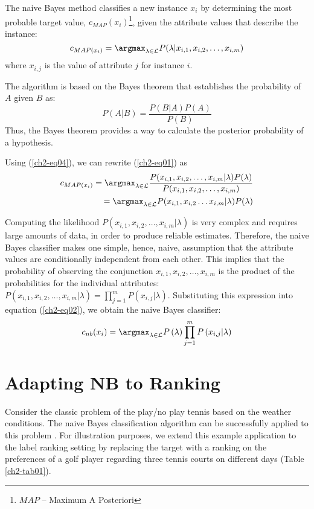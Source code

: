 The naive Bayes method classifies a new instance $x_i$ by determining the most probable target value, $c_{MAP}(x_i)$\footnote[4]{$MAP$ -- Maximum A Posteriori}, given the attribute values that describe the instance:
\begin{equation}
\label{ch2-eq01}
c_{MAP(x_i)}= \argmax_{\lambda \in \mathcal{L}} P(\lambda|x_{i,1}, x_{i,2}, \ldots, x_{i,m})
\end{equation}
where $x_{i,j}$ is the value of attribute $j$ for instance $i$.

The algorithm is based on the  Bayes theorem that establishes the probability of $A$ given $B$ as:
\begin{equation}
\label{ch2-eq04}
 P(A|B)=\frac{P(B|A)P(A)}{P(B)}
\end{equation}
Thus, the Bayes theorem provides a way to calculate the posterior probability of a hypothesis.

Using (\ref{ch2-eq04}), we can rewrite (\ref{ch2-eq01}) as
\begin{align}
\label{ch2-eq02}
 c_{MAP(x_i)}= \argmax_{\lambda\in \mathcal{L}} \frac{P(x_{i,1},x_{i,2}, \ldots, x_{i,m}|\lambda)P(\lambda)}{P(x_{i,1},x_{i,2}, \ldots, x_{i,m})} \notag \\
=\argmax_{\lambda\in \mathcal{L}} P(x_{i,1},x_{i,2} \ldots x_{i,m}|\lambda)P(\lambda)
\end{align}



Computing the likelihood $P(x_{i,1}, x_{i,2}, \ldots, x_{i,m}|\lambda)$ is very complex and requires large amounts of data, in order to produce reliable estimates. Therefore, the naive Bayes classifier makes one simple, hence, naive, assumption that the attribute values are conditionally independent from each other. This implies that the probability of observing the conjunction $x_{i,1},x_{i,2},\ldots,x_{i,m}$ is the product of the probabilities for the individual attributes: $ P(x_{i,1},x_{i,2}, \ldots, x_{i,m}|
\lambda)=\prod_{j=1}^m P(x_{i,j}|\lambda)$. Substituting this expression into equation (\ref{ch2-eq02}), we obtain the naive Bayes classifier:
\begin{equation}
 \label{ch2-eq03}
 c_{nb}(x_i)=\argmax_{\lambda\in \mathcal{L}} P\left(\lambda\right)\prod_{j=1}^m P\left(x_{i,j}|\lambda\right)
\end{equation}

\section{Adapting NB to Ranking}
\label{ch2-sec:adapting}
Consider the classic problem of the play/no play tennis based on the weather conditions. The naive Bayes classification algorithm can be successfully applied to this problem \citep[chap. 6]{mitchell1997}. For illustration purposes, we extend this example application to the label ranking setting by replacing the target with a ranking on the preferences of a golf player regarding three tennis courts on different days (Table \ref{ch2-tab01}).

